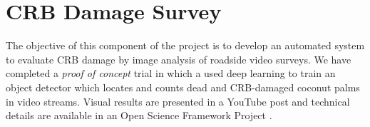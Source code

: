 \documentclass[12pt,letterpaper,english,bibliography=totocnumbered]{scrartcl}
\begin{document}
\begin{comment}
\subsubsection{OrNV Isolate PNG}

Origin: Papua New Guinea; 4 replicates; 71 beetles in total

Mortality curves in 2 significantly different groups: {[}control,
heat-inactivated virus{]}, {[}virus{]}

\subsubsection{OrNV Isolate V23B}

Origin: Solomon Islands; 4 repicates; 66 beetles in total

Mortality curves in 2 significantly different groups: {[}control,
heat-inactivated virus{]}, {[}virus{]}

\section{Environmental Cabinets and CRB Rearing}

Three environmental cabinets which allow control of temperature, relative
humidity, and lighting for insect rearing were procured and installed.
These chambers are set to maintain 30\textdegree{}C, 80\% RH and
12h photoperiod.

After a power outage caused by a typhoon, one of the cabinets malfunctioned.
It heated beyond the setpoint and killed all beetles. To prevent this
problem from recurring, controllers for all three units have been
programmed to send email to project staff whenever a fault is detected.

The project does not currently rear beetles form egg to adult. Because
CRB are so numerous on Guam, it is far more efficient to field collect
prepupae, pupae and adults and rear these to the age required for
bioassays. Adults are fed banana slices.

\end{comment}


\newpage
\section{CRB Damage Survey}

The objective of this component of the project is to develop an automated system to evaluate CRB damage by image analysis of roadside video surveys.  We have completed a \textit{proof of concept} trial in which a used deep learning to train an object detector which locates and counts dead and CRB-damaged coconut palms in video streams.  Visual results are presented in a YouTube post \cite{moore_training_2019} and technical details are available in an Open Science Framework Project \cite{moore_digital_2019}.
\end{document}
